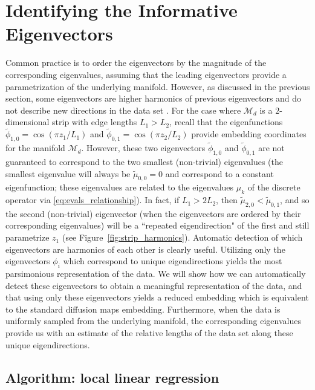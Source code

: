 \documentclass[3p]{elsarticle}
\begin{document}
\section{Identifying the Informative Eigenvectors }

Common practice is to order the eigenvectors by the magnitude of the corresponding eigenvalues,
assuming that the leading eigenvectors provide a parametrization of the underlying manifold.
%
However, as discussed in the previous section, some eigenvectors are higher harmonics of
previous eigenvectors and do not describe new directions in the data set \cite{gerber2007robust}.
%
For the case where $\mathcal{M}_d$ is a $2$-dimensional strip with edge lengths $L_1  > L_2$, recall
that the eigenfunctions $\tilde{\phi}_{1,0} = \cos \left(  {\pi z_1}/{L_1} \right)$ and
$\tilde{\phi}_{0,1} = \cos \left(  {\pi z_2}/{L_2} \right)$ provide embedding coordinates for the manifold $\mathcal{M}_d$.
%
However, these two eigenvectors $\tilde{\phi}_{1, 0}$ and $\tilde{\phi}_{0, 1}$ are not guaranteed to
correspond to the two smallest (non-trivial) eigenvalues (the smallest eigenvalue will always be $\tilde{\mu}_{0,0} = 0$ and
correspond to a constant eigenfunction; these eigenvalues are related to the eigenvalues $\mu_k$ of the discrete
operator via \eqref{eq:evals_relationship}).
%
In fact, if $L_1 > 2 L_2$, then $\tilde{\mu}_{2, 0} < \tilde{\mu}_{0, 1}$, and so the
second (non-trivial) eigenvector (when the eigenvectors are ordered by their corresponding eigenvalues)
will be a ``repeated eigendirection" of the first and still parametrize $z_1$ (see Figure~\ref{fig:strip_harmonics}).
%
Automatic detection of which eigenvectors are harmonics of each other is clearly useful.
%
Utilizing only the eigenvectors $\phi_i$ which correspond to unique eigendirections yields
the most parsimonious representation of the data.
%
We will show how we can automatically detect these eigenvectors to obtain a meaningful representation of the data,
and that using only these eigenvectors yields a reduced embedding which is equivalent to the standard diffusion maps embedding.
%
Furthermore, when the data is uniformly sampled from the underlying manifold, the corresponding eigenvalues provide us with an estimate of the relative lengths of the data set along these unique eigendirections.


\subsection{Algorithm: local linear regression}
\end{document}
